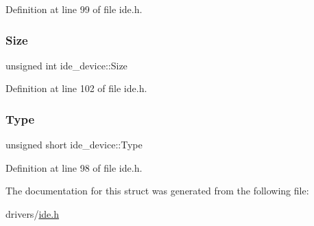 Definition at line 99 of file ide.\+h.

\mbox{\label{structide__device_a37f4be958e0c710ab62e2536497f392d_a37f4be958e0c710ab62e2536497f392d}} 
\subsubsection{\texorpdfstring{Size}{Size}}
{\footnotesize\ttfamily unsigned int ide\+\_\+device\+::\+Size}



Definition at line 102 of file ide.\+h.

\mbox{\label{structide__device_a3a1fc6eda2f5cafc41f8626c67ec9631_a3a1fc6eda2f5cafc41f8626c67ec9631}} 
\subsubsection{\texorpdfstring{Type}{Type}}
{\footnotesize\ttfamily unsigned short ide\+\_\+device\+::\+Type}



Definition at line 98 of file ide.\+h.



The documentation for this struct was generated from the following file\+:\begin{DoxyCompactItemize}
\item 
drivers/\hyperlink{ide_8h}{ide.\+h}\end{DoxyCompactItemize}
